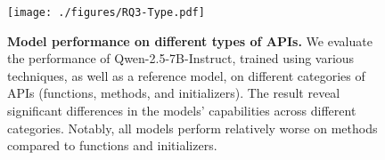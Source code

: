 \begin{figure}[!t]
	\centering
	\texttt{[image: ./figures/RQ3-Type.pdf]}
         \vspace{-1.5em}
         \caption{\textbf{Model performance on different types of APIs.}
         We evaluate the performance of Qwen-2.5-7B-Instruct, trained using various techniques, as well as a reference model, on different categories of APIs (functions, methods, and initializers). The result reveal significant differences in the models' capabilities across different categories. Notably, all models perform relatively worse on methods compared to functions and initializers. 
         }
	\label{fig_rq3_type}
	\vspace{-1em}
\end{figure}

